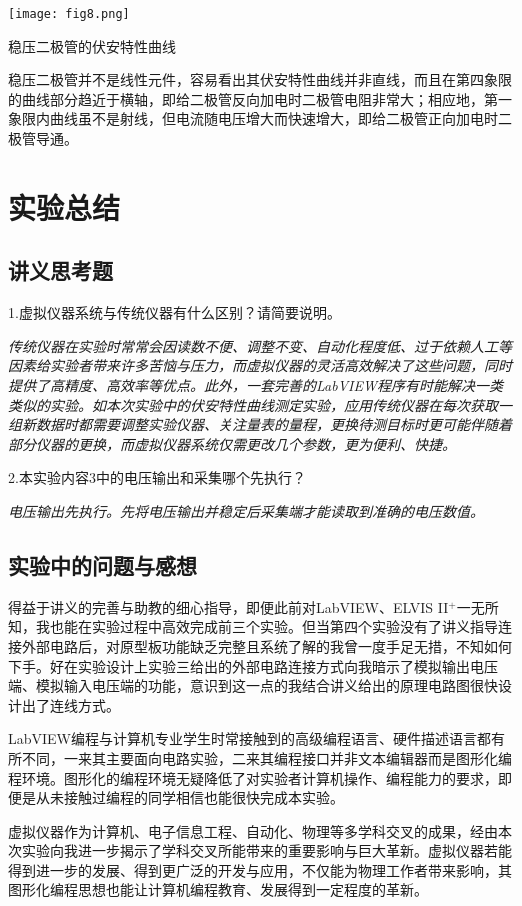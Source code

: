 \documentclass[UTF-8,twoside,cs4size]{ctexart}
\begin{document}
	\begin{table}[h]
		\centering
		\texttt{[image: fig8.png]}
		\caption{\small 稳压二极管的伏安特性曲线}
	\end{table}

	稳压二极管并不是线性元件，容易看出其伏安特性曲线并非直线，而且在第四象限的曲线部分趋近于横轴，即给二极管反向加电时二极管电阻非常大；相应地，第一象限内曲线虽不是射线，但电流随电压增大而快速增大，即给二极管正向加电时二极管导通。
	
	\section{实验总结}
	\subsection{讲义思考题}
	1.虚拟仪器系统与传统仪器有什么区别？请简要说明。
	
	\textit{传统仪器在实验时常常会因读数不便、调整不变、自动化程度低、过于依赖人工等因素给实验者带来许多苦恼与压力，而虚拟仪器的灵活高效解决了这些问题，同时提供了高精度、高效率等优点。此外，一套完善的LabVIEW程序有时能解决一类类似的实验。如本次实验中的伏安特性曲线测定实验，应用传统仪器在每次获取一组新数据时都需要调整实验仪器、关注量表的量程，更换待测目标时更可能伴随着部分仪器的更换，而虚拟仪器系统仅需更改几个参数，更为便利、快捷。}
	
	2.本实验内容3中的电压输出和采集哪个先执行？
	
	\textit{电压输出先执行。先将电压输出并稳定后采集端才能读取到准确的电压数值。}
	
	\subsection{实验中的问题与感想}
	得益于讲义的完善与助教的细心指导，即便此前对LabVIEW、ELVIS II$ ^+ $一无所知，我也能在实验过程中高效完成前三个实验。但当第四个实验没有了讲义指导连接外部电路后，对原型板功能缺乏完整且系统了解的我曾一度手足无措，不知如何下手。好在实验设计上实验三给出的外部电路连接方式向我暗示了模拟输出电压端、模拟输入电压端的功能，意识到这一点的我结合讲义给出的原理电路图很快设计出了连线方式。
	
	LabVIEW编程与计算机专业学生时常接触到的高级编程语言、硬件描述语言都有所不同，一来其主要面向电路实验，二来其编程接口并非文本编辑器而是图形化编程环境。图形化的编程环境无疑降低了对实验者计算机操作、编程能力的要求，即便是从未接触过编程的同学相信也能很快完成本实验。
	
	虚拟仪器作为计算机、电子信息工程、自动化、物理等多学科交叉的成果，经由本次实验向我进一步揭示了学科交叉所能带来的重要影响与巨大革新。虚拟仪器若能得到进一步的发展、得到更广泛的开发与应用，不仅能为物理工作者带来影响，其图形化编程思想也能让计算机编程教育、发展得到一定程度的革新。
\end{document}
